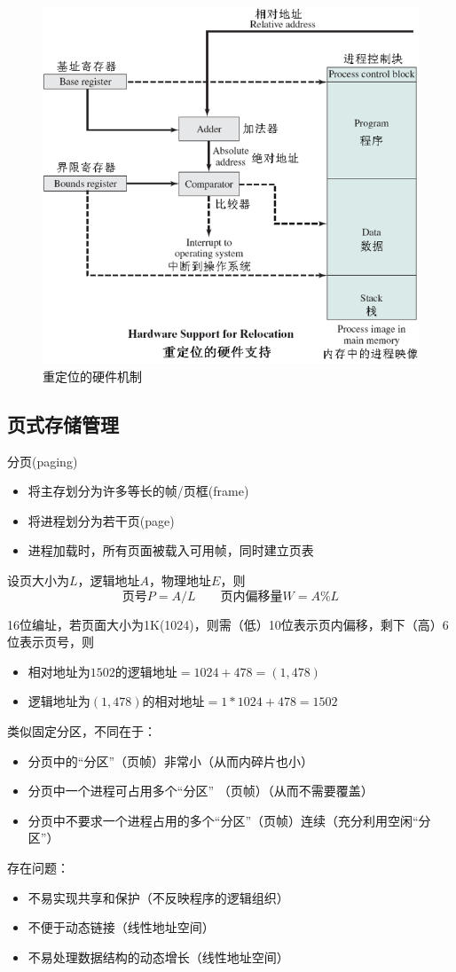 \begin{figure}[H]
    \centering
    \includegraphics[width=0.5\linewidth]{fig/relocation.png}
    \caption*{重定位的硬件机制}
\end{figure}

\subsection{页式存储管理}
分页(paging)
\begin{itemize}
    \item 将主存划分为许多等长的帧/页框(frame)
    \item 将进程划分为若干页(page)
    \item 进程加载时，所有页面被载入可用帧，同时建立页表
\end{itemize}

设页大小为$L$，逻辑地址$A$，物理地址$E$，则
\[\text{页号}P=A/L\qquad\text{页内偏移量}W=A\%L\]

\begin{example}
    16位编址，若页面大小为1K(1024)，则需（低）10位表示页内偏移，剩下（高）6位表示页号，则
    \begin{itemize}
        \item 相对地址为$1502$的逻辑地址$ = 1024 + 478 = (1, 478)$
        \item 逻辑地址为$(1, 478)$的相对地址$ = 1*1024 + 478 = 1502$
    \end{itemize}
\end{example}

类似固定分区，不同在于：
\begin{itemize}
    \item 分页中的“分区”（页帧）非常小（从而内碎片也小）
    \item 分页中一个进程可占用多个“分区” （页帧）（从而不需要覆盖）
    \item 分页中不要求一个进程占用的多个“分区”（页帧）连续（充分利用空闲“分区”）
\end{itemize}
存在问题：
\begin{itemize}
\item 不易实现共享和保护（不反映程序的逻辑组织）
\item 不便于动态链接（线性地址空间）
\item 不易处理数据结构的动态增长（线性地址空间）
\end{itemize}

